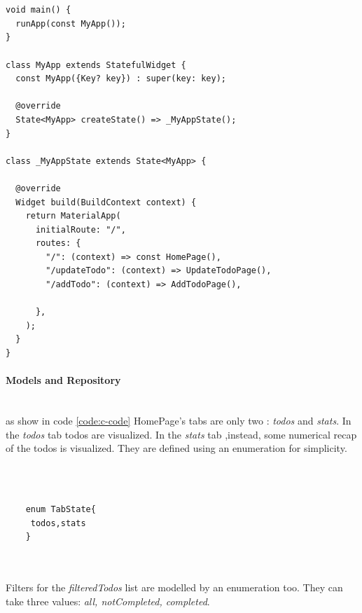 		\begin{code}
		
		\mbox{}\\
		 \mbox{}
		
		\label{code:2.1}

	\begin{verbatim}
	
void main() {
  runApp(const MyApp());
}

class MyApp extends StatefulWidget {
  const MyApp({Key? key}) : super(key: key);

  @override
  State<MyApp> createState() => _MyAppState();
}

class _MyAppState extends State<MyApp> {

  @override
  Widget build(BuildContext context) {
    return MaterialApp(
      initialRoute: "/",
      routes: {
        "/": (context) => const HomePage(),
        "/updateTodo": (context) => UpdateTodoPage(),
        "/addTodo": (context) => AddTodoPage(),

      },
    );
  }
}	
	\end{verbatim}
	
\end{code}	
	
	\paragraph{Models and Repository} \mbox{} \\
	\label{par:todo_app_models_and_repository}
as show in code \ref{code:c-code} HomePage's tabs are only two : \textit{todos} and \textit{stats}. In the \textit{todos} tab todos are visualized. In the \textit{stats} tab ,instead, some numerical recap of the todos is visualized. They are defined using an enumeration for simplicity.

	\mbox{}\\
	\begin{code}
	
			\label{code:2.2}

	 \mbox{}
	\begin{verbatim}
	
	enum TabState{
	 todos,stats
	}
	
	
	\end{verbatim}
	\end{code}
	\mbox{}
	
Filters for the \textit{filteredTodos} list are modelled by an enumeration too. They can take three values: \textit{all, notCompleted, completed}.
	
